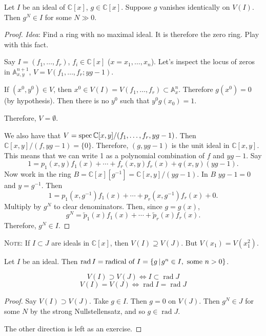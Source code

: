 \documentclass [letterpaper,11pt,twoside]{article}
\begin{document}
    \begin{thm*}
      Let $I$ be an ideal of $\mathbb C[x]$, $g\in \mathbb C[x]$.  Suppose $g$ vanishes identically on $V(I)$.  Then $g^N \in I$ for some $N \gg 0$.
    \end{thm*}
    \begin{proof}
      \emph{Idea}: Find a ring with no maximal ideal.  It is therefore the zero ring.  Play with this fact.

      Say $I = (f_1, \ldots, f_r)$, $f_i \in \mathbb C[x]$ ($x = x_1, \ldots, x_n$).  Let's inspect the locus of zeros in $\mathbb A^{n+1}_{x,y}$, $V = V(f_1, \ldots, f_r; yg - 1)$.

      If $(x^0, y^0) \in V$, then $x^0 \in V(I) = V(f_1, \ldots, f_r) \subset \mathbb A^n_x$.  Therefore $g(x^0) = 0$ (by hypothesis).  Then there is no $y^0$ such that $y^0 g(x_0) = 1$.

      Therefore, $V = \emptyset$.

      We also have that $V = \operatorname{spec} \mathbb C[x, y] / (f_1, \ldots, f_r, yg - 1)$.  Then $\mathbb C[x, y] / (f, yg - 1) = \{0\}$.  Therefore, $(g, yg - 1)$ is the unit ideal in $\mathbb C[x, y]$.  This means that we can write 1 as a polynomial combination of $f$ and $yg - 1$.  Say
      $$1 = p_1(x, y)f_1(x) + \cdots + f_r(x, y) f_r(x) + q(x, y) (y g - 1).$$
      Now work in the ring $B = \mathbb C[x][g^{-1}] = \mathbb C[x, y] / (y g - 1)$.  In $B$ $yg - 1 = 0$ and $y = g^{-1}$.  Then
      $$1 = p_1(x, g^{-1}) f_1(x) + \cdots + p_r(x, g^{-1}) f_r(x) + 0.$$
      Multiply by $g^N$ to clear denominators.  Then, since $g = g(x)$,
      $$g^N = \tilde p_1(x) f_1(x) + \cdots + \tilde p_r(x) f_r(x).$$
      Therefore, $g^N \in I$.
    \end{proof}

    \textsc{Note}: If $I \subset J$ are ideals in $\mathbb C[x]$, then $V(I) \supseteq V(J)$.  But $V(x_1) = V(x_1^2)$.

    Let $I$ be an ideal.  Then $\operatorname{rad}I = \text{radical of }I = \mathset[g]{g^n \in I,\text{ some }n > 0}$.

    \begin{thm*}
      $$V(I) \supset V(J) \iff I \subset \operatorname{rad}J$$
      $$V(I) = V(J) \iff \operatorname{rad}I = \operatorname{rad} J$$
    \end{thm*}
    \begin{proof}
      Say $V(I) \supset V(J)$.  Take $g\in I$.  Then $g = 0$ on $V(J)$.  Then $g^N \in J$ for some $N$ by the strong Nullstellensatz, and so $g \in \operatorname{rad} J$.

      The other direction is left as an exercise.
    \end{proof}
\end{document}
